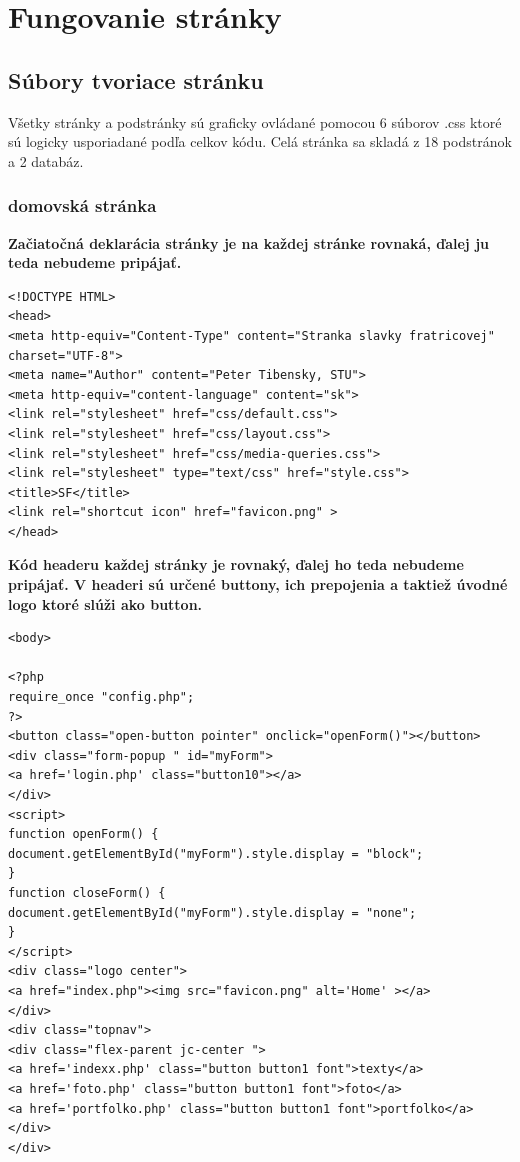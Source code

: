 \chapter{Fungovanie stránky}
\section{Súbory tvoriace stránku}

Všetky stránky a podstránky sú graficky ovládané pomocou 6 súborov .css ktoré sú logicky usporiadané podľa celkov kódu. Celá stránka sa skladá z 18 podstránok a 2 databáz.

\subsection{domovská stránka}
\vspace{0.5cm}
\textbf{Začiatočná deklarácia stránky je na každej stránke rovnaká, ďalej ju teda nebudeme pripájať.}
\vspace{0.5cm}
\begin{lstlisting}
<!DOCTYPE HTML>
<head>
<meta http-equiv="Content-Type" content="Stranka slavky fratricovej" charset="UTF-8">
<meta name="Author" content="Peter Tibensky, STU">
<meta http-equiv="content-language" content="sk">
<link rel="stylesheet" href="css/default.css">
<link rel="stylesheet" href="css/layout.css">
<link rel="stylesheet" href="css/media-queries.css">
<link rel="stylesheet" type="text/css" href="style.css">
<title>SF</title>
<link rel="shortcut icon" href="favicon.png" >
</head>
\end{lstlisting}
\vspace{0.5cm}
\textbf{Kód headeru každej stránky je rovnaký, ďalej ho teda nebudeme pripájať. V headeri sú určené buttony, ich prepojenia a taktiež úvodné logo ktoré slúži ako button.}
\vspace{0.5cm}
\begin{lstlisting}
<body>

<?php
require_once "config.php";
?>
<button class="open-button pointer" onclick="openForm()"></button>
<div class="form-popup " id="myForm">
<a href='login.php' class="button10"></a>
</div>
<script>
function openForm() {
document.getElementById("myForm").style.display = "block";
}
function closeForm() {
document.getElementById("myForm").style.display = "none";
}
</script>
<div class="logo center">
<a href="index.php"><img src="favicon.png" alt='Home' ></a>
</div>
<div class="topnav">
<div class="flex-parent jc-center ">
<a href='indexx.php' class="button button1 font">texty</a>
<a href='foto.php' class="button button1 font">foto</a>
<a href='portfolko.php' class="button button1 font">portfolko</a>
</div>
</div>

\end{lstlisting}
